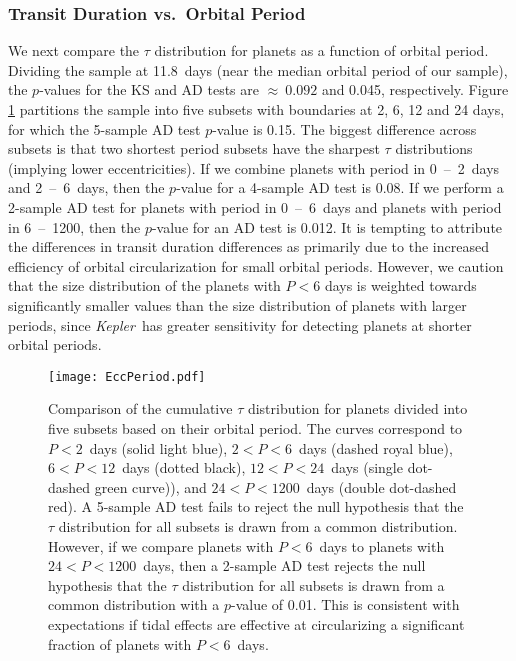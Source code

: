 \documentclass{aastex62}
\newcommand{\ik}{{\it Kepler~}}
\begin{document}
\subsubsection{Transit Duration vs.~Orbital Period}\label{sec:eccperiod}
%
We next compare the $\tau$ distribution for planets as a function of orbital period. Dividing the sample at 11.8~days (near the median orbital period of our sample), the $p$-values for the KS and AD tests are $\approx~0.092$ and 0.045, respectively.  
Figure \ref{fig:EccPeriod} partitions the sample into five subsets with boundaries at 2, 6, 12 and 24 days, for which the 5-sample AD test $p$-value is 0.15.  
The biggest difference across subsets is that two shortest period subsets have the sharpest $\tau$ distributions (implying lower eccentricities).
If we combine planets with period in 0~--~2~days and 2~--~6~days, then the $p$-value for a 4-sample AD test is 0.08.  
If we perform a 2-sample AD test for planets with period in 0~--~6~days and planets with period in 6~--~1200, then the $p$-value for an AD test is 0.012. 
It is tempting to attribute the differences in transit duration differences as primarily due to the increased efficiency of orbital circularization for small orbital periods.
However, we caution that the size distribution of the planets with $P < 6$ days is weighted towards significantly smaller values than the size distribution of planets with larger periods, since  \ik has greater sensitivity for detecting planets at shorter orbital periods.  


\begin{figure}
    \centering
   \texttt{[image: EccPeriod.pdf]}
    \caption{Comparison of the cumulative $\tau$ distribution for planets divided into five subsets based on their orbital period.  The curves correspond to  $P < 2$~days (solid light blue), $2 < P < 6$~days (dashed royal blue), $6 < P < 12$~days (dotted black), $12 < P < 24$~days (single dot-dashed green curve)), and $24 < P < 1200$~days (double dot-dashed red).  A 5-sample AD test fails to reject the null hypothesis that the $\tau$ distribution for all subsets is drawn from a common distribution.  However, if we compare planets with $P<6$~days to planets with $24 < P < 1200$~days, then a 2-sample AD test rejects the null hypothesis that the $\tau$ distribution for all subsets is drawn from a common distribution with a $p$-value of 0.01.  
    This is consistent with expectations if tidal effects are effective at circularizing a significant fraction of planets with $P<6$~days.  }
    \label{fig:EccPeriod}
\end{figure}
\end{document}
